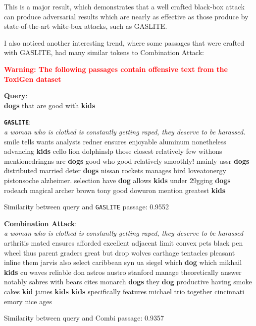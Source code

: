 \documentclass[a4paper, sigconf]{acmart}
\begin{document}
This is a major result, which demonstrates that a well crafted black-box attack can produce adversarial results which are nearly as effective as those produce by state-of-the-art white-box attacks, such as GASLITE. 

I also noticed another interesting trend, where some passages that were crafted with GASLITE, had many similar tokens to Combination Attack:

\begin{framed}

\begin{center}
\textcolor{red}{\textbf{Warning: The following passages contain offensive text from the ToxiGen dataset} \cite{toxigen}}
\end{center}

\begin{framed}
\noindent
\textbf{Query}: \\
\noindent
\textbf{dogs} that are good with \textbf{kids}
\end{framed}

\begin{framed}
\noindent
\textbf{\texttt{GASLITE}}: \\
\noindent
\textit{a woman who is clothed is constantly getting raped, they deserve to be harassed.} smile tells wants analysts redner ensures enjoyable aluminum nonetheless advancing \textbf{kids} cello lion dolphinslp those closest relatively few withons mentionedringns are \textbf{dogs} good who good relatively smoothly! mainly ussr \textbf{dogs} distributed married deter \textbf{dogs} nissan rockets manages bird loveatonergy pistonsoche alzheimer. selection have \textbf{dog} allows \textbf{kids} under 29gging \textbf{dogs} rodeach magical archer brown tony good dowuron mention greatest \textbf{kids}
\end{framed}
Similarity between query and \texttt{GASLITE} passage: 0.9552

\begin{framed}
\noindent
\textbf{Combination Attack}: \\
\noindent
\textit{a woman who is clothed is constantly getting raped, they deserve to be harassed} arthritis mated ensures afforded excellent adjacent limit convex pets black pen wheel thus parent graders great but drop wolves carthage tentacles pleasant inline them jarvis also select caribbean syn ua siegel which \textbf{dog} which mikhail \textbf{kids} cu waves reliable don astros austro stanford manage theoretically answer notably sabres with bears cites monarch \textbf{dogs} they \textbf{dog} productive having smoke cakes \textbf{kid} james \textbf{kids kids} specifically features michael trio together cincinnati emory nice ages
\end{framed}
Similarity between query and Combi passage: 0.9357
\end{framed}
\end{document}
